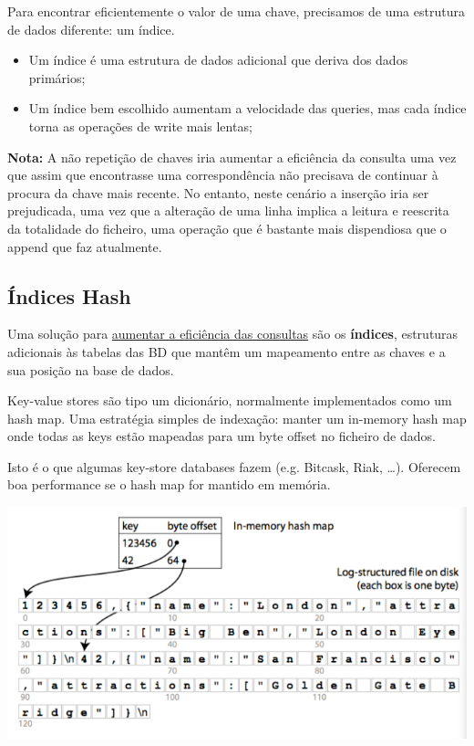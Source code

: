 \documentclass{article}
\begin{document}
Para encontrar eficientemente o valor de uma chave, precisamos de uma
estrutura de dados diferente: um índice.
\begin{itemize}
  \item Um índice é uma estrutura de dados adicional que deriva dos dados primários;
  \item Um índice bem escolhido aumentam a velocidade das queries, mas cada índice
  torna as operações de write mais lentas;
\end{itemize}

\begin{flushleft}
  \textbf{Nota:} A não repetição de chaves iria aumentar a eficiência da consulta uma vez que assim que encontrasse uma
  correspondência não precisava de continuar à procura da chave mais recente. No entanto, neste cenário a inserção iria
  ser prejudicada, uma vez que a alteração de uma linha implica a leitura e reescrita da totalidade do ficheiro, uma
  operação que é bastante mais dispendiosa que o
  append que faz atualmente.
\end{flushleft}

\subsection{Índices Hash}

Uma solução para \uline{aumentar a eficiência das consultas} são os \textbf{índices}, estruturas adicionais às
tabelas das BD que mantêm um mapeamento entre as chaves e a sua posição na base de
dados.

Key-value stores são tipo um dicionário, normalmente implementados como um hash map.
Uma estratégia simples de indexação: manter um in-memory hash map onde todas as keys
estão mapeadas para um byte offset no ficheiro de dados.

Isto é o que algumas key-store databases fazem (e.g. Bitcask, Riak, \dots).
Oferecem boa performance se o hash map for mantido em memória.

\begin{center}
  \includegraphics[scale=0.3]{42}
\end{center}
\end{document}
